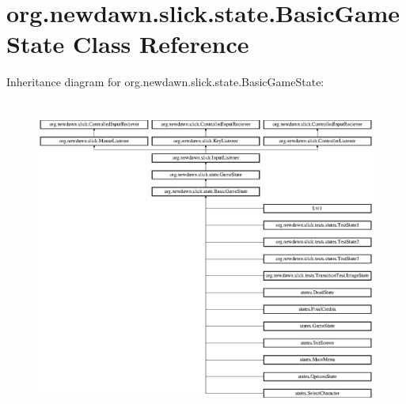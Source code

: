 \hypertarget{classorg_1_1newdawn_1_1slick_1_1state_1_1_basic_game_state}{}\section{org.\+newdawn.\+slick.\+state.\+Basic\+Game\+State Class Reference}
\label{classorg_1_1newdawn_1_1slick_1_1state_1_1_basic_game_state}
Inheritance diagram for org.\+newdawn.\+slick.\+state.\+Basic\+Game\+State\+:\begin{figure}[H]
\begin{center}
\leavevmode
\includegraphics[height=10.542636cm]{classorg_1_1newdawn_1_1slick_1_1state_1_1_basic_game_state}
\end{center}
\end{figure}
